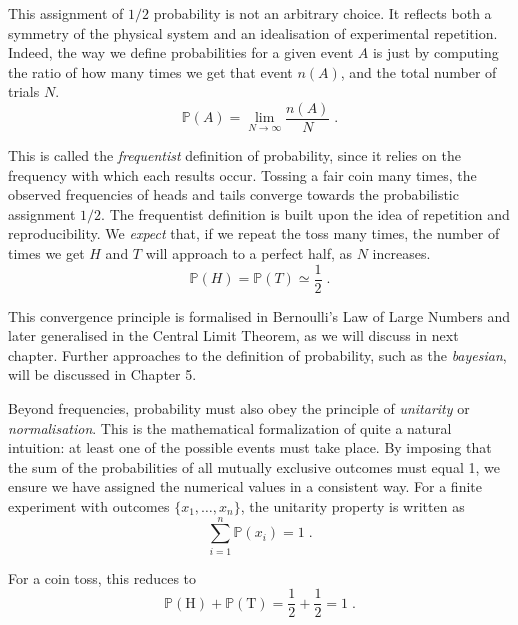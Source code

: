 \documentclass{book}
\begin{document}
This assignment of $1/2$ probability is not an arbitrary choice. It reflects both a symmetry of the physical system and an idealisation of experimental repetition. Indeed, the way we define probabilities for a given event $A$ is just by computing the ratio of how many times we get that event $n(A)$, and the total number of trials $N$.
\begin{equation}
    \mathbb{P}(A) = \lim_{N\to\infty} \frac{n(A)}{N} \; .
    \label{eq:prob_frequentist}
\end{equation}

This is called the \textit{frequentist} definition of probability, since it relies on the frequency with which each results occur. Tossing a fair coin many times, the observed frequencies of heads and tails converge towards the probabilistic assignment $1/2$. The frequentist definition is built upon the idea of repetition and reproducibility. We \textit{expect} that, if we repeat the toss many times, the number of times we get $H$ and $T$ will approach to a perfect half, as $N$ increases.
\begin{equation}
	\mathbb{P}(H) = \mathbb{P}(T) \simeq \frac{1}{2} \; . \nonumber
	\label{eq:prob_coin}
\end{equation}

This convergence principle is formalised in Bernoulli’s Law of Large Numbers and later generalised in the Central Limit Theorem, as we will discuss in next chapter. Further approaches to the definition of probability, such as the \textit{bayesian}, will be discussed in Chapter 5.

\medskip

Beyond frequencies, probability must also obey the principle of \textit{unitarity} or \textit{normalisation}. This is the mathematical formalization of quite a natural intuition: at least one of the possible events must take place. By imposing that the sum of the probabilities of all mutually exclusive outcomes must equal 1, we ensure we have assigned the numerical values in a consistent way. For a finite experiment with outcomes $\{x_1,\ldots, x_n\}$, the unitarity property is written as
\begin{equation}
    \sum_{i=1}^{n} \mathbb{P}(x_i) = 1 \; .
    \label{eq:unitarity}
\end{equation}

For a coin toss, this reduces to
\begin{equation}
    \mathbb{P}(\text{H}) + \mathbb{P}(\text{T}) = \frac{1}{2} + \frac{1}{2} = 1 \; . \nonumber
\end{equation}
\end{document}
